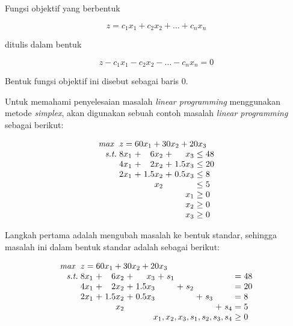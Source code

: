 Fungsi objektif yang berbentuk

\begin{equation*}
	z = c_1x_1 + c_2x_2 + \dots + c_nx_n
\end{equation*}

ditulis dalam bentuk

\begin{equation*}
	z - c_1x_1 - c_2x_2 - \dots - c_nx_n = 0
\end{equation*}

Bentuk fungsi objektif ini disebut sebagai baris 0.

Untuk memahami penyelesaian masalah \textit{linear programming} menggunakan metode \textit{simplex}, akan digunakan sebuah contoh masalah \textit{linear programming} sebagai berikut:

\begin{equation*}
	\setlength\arraycolsep{1.5pt}
	\begin{array}{r r c r c r c l}
		\textit{max } &\multicolumn{7}{l}{z = 60x_1 + 30x_2 + 20x_3}\\
		\textit{s.t.} &8x_1 &+ &6x_2 &+ &x_3 &\leq &48\\
		&4x_1 &+ &2x_2 &+ &1.5x_3 &\leq &20\\
		&2x_1 &+ &1.5x_2 &+ &0.5x_3 &\leq &8\\
		&&&x_2 &&&\leq &5\\
		&&&&&x_1 &\geq &0\\
		&&&&&x_2 &\geq &0\\
		&&&&&x_3 &\geq &0\\
	\end{array}
\end{equation*}

Langkah pertama adalah mengubah masalah ke bentuk standar, sehingga masalah ini dalam bentuk standar adalah sebagai berikut:

\begin{equation*}
	\setlength\arraycolsep{1.5pt}
	\begin{array}{r r c r c r c r c r c r c r c l}
		\textit{max } &\multicolumn{15}{l}{z = 60x_1 + 30x_2 + 20x_3}\\
		\textit{s.t.} &8x_1 &+ &6x_2 &+ &x_3 &+ &s_1 &&&&&&&= &48\\
		&4x_1 &+ &2x_2 &+ &1.5x_3 &&&+ &s_2 &&&&&= &20\\
		&2x_1 &+ &1.5x_2 &+ &0.5x_3 &&&&&+ &s_3 &&&= &8\\
		&&&x_2 && &&&&&&&+ &s_4 &= &5\\
		\multicolumn{14}{r}{x_1, x_2, x_3, s_1, s_2, s_3, s_4} &\geq &0\\
	\end{array}
\end{equation*}

